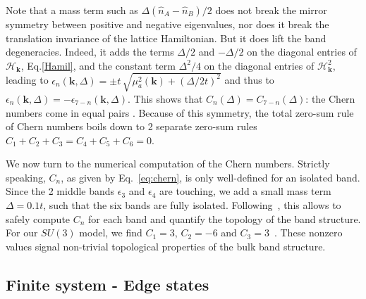 \documentclass[aps,pra,showpacs,twocolumn,superscriptaddress]{revtex4-1}
\begin{document}
Note that a mass term such as $\Delta(\hat{n}_A-\hat{n}_B)/2$ does not break the mirror 
symmetry between positive and negative eigenvalues, nor does it break the translation invariance 
of the lattice Hamiltonian. But it does lift the band degeneracies. Indeed, it adds the 
terms $\Delta /2$ and $-\Delta /2$ on the diagonal entries of $\mathcal{H}_{\mathbf{k}}$, 
Eq.\eqref{Hamil}, and the constant term $\Delta^2/4$ on the diagonal entries of 
$\mathcal{H}^2_{\mathbf{k}}$, leading to 
$\epsilon_n(\mathbf{k}, \Delta) =\pm t \, \sqrt{\mu_a^2(\mathbf{k})+(\Delta/2t)^2}$ and 
thus to $\epsilon_n(\mathbf{k},\Delta) = -\epsilon_{7-n}(\mathbf{k},\Delta)$. 
This shows that $C_n(\Delta) = C_{7-n}(\Delta)$: the Chern numbers come in equal 
pairs \cite{Comment3}. Because of this symmetry, the total zero-sum rule of 
Chern numbers boils down to 2 separate zero-sum rules $C_1+C_2+C_3=C_4+C_5+C_6=0$.

We now turn to the numerical computation of the Chern numbers. Strictly speaking, $C_n$, 
as given by Eq.~\eqref{eq:chern}, is only well-defined for an isolated band. Since the 2 
middle bands $\epsilon_3$ and $\epsilon_4$ are touching, we add a small mass term $\Delta=0.1t$, such that the six bands 
are fully isolated. Following~\cite{Fukui2005}, this allows to safely compute $C_n$ 
for each band and quantify the topology of the band structure. 
For our $SU(3)$ model, we find $C_1=3$, $C_2=-6$ and $C_3=3$~\cite{Comments4}. 
These nonzero values signal non-trivial topological properties of the bulk band structure. 


\subsection{Finite system - Edge states}
\end{document}
